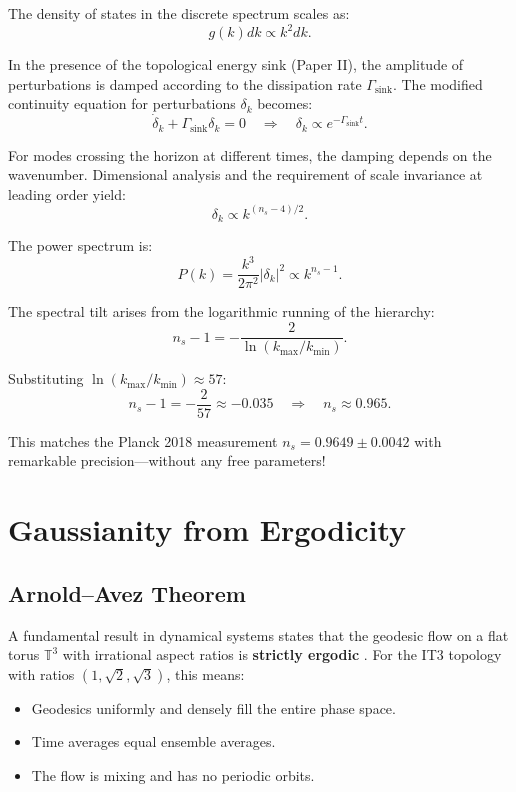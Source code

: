 \documentclass[12pt,a4paper]{article}
\begin{document}
The density of states in the discrete spectrum scales as:
\begin{equation}
g(k) dk \propto k^2 dk.
\end{equation}

In the presence of the topological energy sink (Paper II), the amplitude of perturbations is damped according to the dissipation rate $\Gamma_{\mathrm{sink}}$. The modified continuity equation for perturbations $\delta_k$ becomes:
\begin{equation}
\dot{\delta}_k + \Gamma_{\mathrm{sink}} \delta_k = 0 \quad \Rightarrow \quad \delta_k \propto e^{-\Gamma_{\mathrm{sink}} t}.
\end{equation}

For modes crossing the horizon at different times, the damping depends on the wavenumber. Dimensional analysis and the requirement of scale invariance at leading order yield:
\begin{equation}
\delta_k \propto k^{(n_s - 4)/2}.
\end{equation}

The power spectrum is:
\begin{equation}
P(k) = \frac{k^3}{2\pi^2} |\delta_k|^2 \propto k^{n_s - 1}.
\end{equation}

The spectral tilt arises from the logarithmic running of the hierarchy:
\begin{equation}
n_s - 1 = -\frac{2}{\ln(k_{\max}/k_{\min})}.
\label{eq:ns}
\end{equation}

Substituting $\ln(k_{\max}/k_{\min}) \approx 57$:
\begin{equation}
n_s - 1 = -\frac{2}{57} \approx -0.035 \quad \Rightarrow \quad n_s \approx 0.965.
\end{equation}

This matches the Planck 2018 measurement $n_s = 0.9649 \pm 0.0042$ \citep{Planck2020} with remarkable precision---without any free parameters!

\section{Gaussianity from Ergodicity}

\subsection{Arnold--Avez Theorem}

A fundamental result in dynamical systems states that the geodesic flow on a flat torus $\mathbb{T}^3$ with irrational aspect ratios is \textbf{strictly ergodic} \citep{Arnold1968}. For the IT3 topology with ratios $(1, \sqrt{2}, \sqrt{3})$, this means:
\begin{itemize}
    \item Geodesics uniformly and densely fill the entire phase space.
    \item Time averages equal ensemble averages.
    \item The flow is mixing and has no periodic orbits.
\end{itemize}
\end{document}
